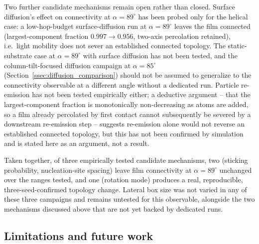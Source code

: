 \documentclass[aip,amsmath,amssymb,reprint]{revtex4-1}
\newcommand{\dang}{\ensuremath{\alpha}}
\begin{document}
Two further candidate mechanisms remain open rather than closed. Surface
diffusion's effect on connectivity at $\dang=89^{\circ}$ has been probed
only for the helical case: a low-hop-budget surface-diffusion run at
$\dang=89^{\circ}$ leaves the film connected (largest-component fraction
$0.997\!\to\!0.956$, two-axis percolation retained), i.e.\ light
mobility does not sever an established connected topology. The
static-substrate case at $\dang=89^{\circ}$ with surface diffusion has
not been tested, and the column-tilt-focused diffusion campaign at
$\dang=85^{\circ}$ (Section~\ref{ssec:diffusion_comparison}) should not
be assumed to generalize to the connectivity observable at a different
angle without a dedicated run.
Particle re-emission has not been tested empirically either; a
deductive argument -- that the largest-component fraction is
monotonically non-decreasing as atoms are added, so a film already
percolated by first contact cannot subsequently be severed by a
downstream re-emission step -- suggests re-emission alone would not
reverse an established connected topology, but this has not been
confirmed by simulation and is stated here as an argument, not a result.

Taken together, of three empirically tested candidate mechanisms, two
(sticking probability, nucleation-site spacing) leave film connectivity
at $\dang=89^{\circ}$ unchanged over the ranges tested, and one
(rotation mode) produces a real, reproducible, three-seed-confirmed
topology change. Lateral box size was not varied in any of these three
campaigns and remains untested for this observable, alongside the two
mechanisms discussed above that are not yet backed by dedicated runs.

\subsection{Limitations and future work}
\label{ssec:limits}
\end{document}
